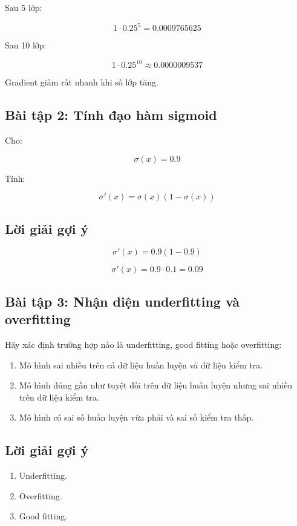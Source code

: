 Sau 5 lớp:

\[
    1\cdot 0.25^5
    =
    0.0009765625
\]

Sau 10 lớp:

\[
    1\cdot 0.25^{10}
    \approx
    0.0000009537
\]

Gradient giảm rất nhanh khi số lớp tăng.

\subsection*{Bài tập 2: Tính đạo hàm sigmoid}

Cho:

\[
    \sigma(x)=0.9
\]

Tính:

\[
    \sigma'(x)=\sigma(x)(1-\sigma(x))
\]

\subsection*{Lời giải gợi ý}

\[
    \sigma'(x)=0.9(1-0.9)
\]

\[
    \sigma'(x)=0.9\cdot 0.1=0.09
\]

\subsection*{Bài tập 3: Nhận diện underfitting và overfitting}

Hãy xác định trường hợp nào là underfitting, good fitting hoặc overfitting:

\begin{enumerate}
    \item Mô hình sai nhiều trên cả dữ liệu huấn luyện và dữ liệu kiểm tra.
    \item Mô hình đúng gần như tuyệt đối trên dữ liệu huấn luyện nhưng sai nhiều trên dữ liệu kiểm tra.
    \item Mô hình có sai số huấn luyện vừa phải và sai số kiểm tra thấp.
\end{enumerate}

\subsection*{Lời giải gợi ý}

\begin{enumerate}
    \item Underfitting.
    \item Overfitting.
    \item Good fitting.
\end{enumerate}

